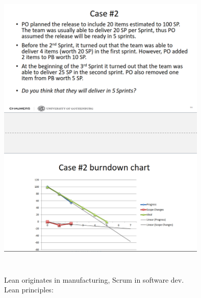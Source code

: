 \documentclass[10pt]{article}
\begin{document}
\includegraphics[width=10cm, height=15cm]{Burndown2}\\
Lean originates in manufacturing, Scrum in software dev.\\
Lean principles:
\end{document}
